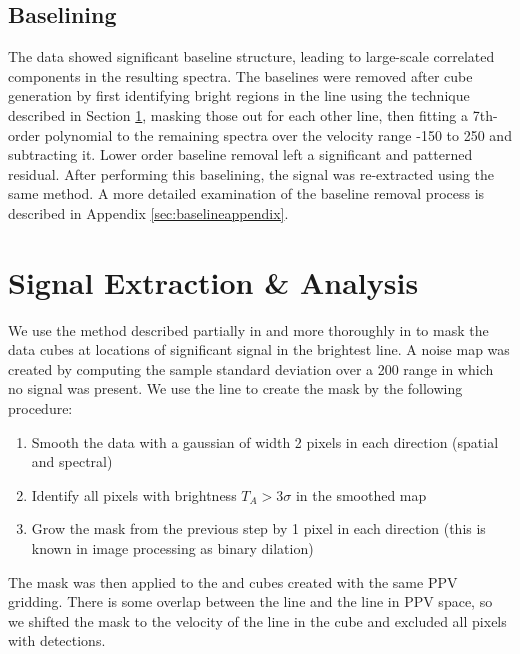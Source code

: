 \subsection{Baselining}
\label{sec:baseline}
The data showed significant baseline structure, leading to large-scale
correlated components in the resulting spectra.  The baselines were removed
after cube generation by first identifying bright regions in the \para
\threeohthree line using the technique described in Section \ref{sec:signal},
masking those out for each other line, then fitting a 7th-order polynomial to
the remaining spectra over the velocity range -150 to 250 \kms and subtracting
it.  Lower order baseline removal left a significant and patterned residual.
After performing this baselining, the signal was re-extracted using the same
method.  A more detailed examination of the baseline removal process is
described in Appendix \ref{sec:baselineappendix}.

\section{Signal Extraction \& Analysis}
\label{sec:signal}
We use the method described partially in \citet{Ao2013a} and more thoroughly in
\citet{Dame2011b} to mask the data cubes at locations of significant signal in 
the brightest line. 
A noise map was created by computing the sample standard deviation over a
200 \kms range in which no signal was present.
We use the \para \threeohthree line to create the mask by
the following procedure:

\begin{enumerate}
    \item Smooth the data with a gaussian of width 2 pixels in each direction
        (spatial and spectral)
    \item Identify all pixels with brightness $T_A > 3\sigma$ in the smoothed
        map
    \item Grow the mask from the previous step by 1 pixel in each direction
        (this is known in image processing as binary dilation)
\end{enumerate}

The \para \threeohthree mask was then applied to the \threetwoone and
\threetwotwo cubes created with the same PPV gridding.  There is some overlap
between the \methanol \fourtwotwo line and the \para \threetwotwo line in PPV
space, so we shifted the \para mask to the velocity of the \methanol line in
the \para \threetwotwo cube and excluded all pixels with \para detections.

